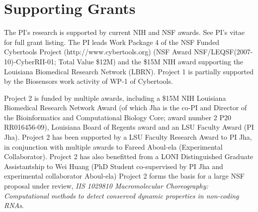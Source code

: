 \documentclass[a4paper,10pt]{article}
\newcommand{\up}{\vspace*{-1em}}
\begin{document}

\up\up
\section*{Supporting Grants}
\up

The PI's research is supported by current NIH and NSF awards.  See PI's vitae for full grant listing.
The PI leads Work Package 4 of the NSF Funded Cybertools Project (http://www.cybertools.org) (NSF Award NSF/LEQSF(2007-10)-CyberRII-01; Total Value \$12M) and the \$15M NIH award supporting the Louisiana Biomedical Research Network (LBRN). Project 1 is partially supported by the Biosensors work activity of WP-1 of Cybertools.

Project 2 is funded by multiple awards, including a \$15M NIH Louisiana Biomedical Research Network Award (of which Jha is the co-PI and Director of the Bioinformatics and Computational Biology Core; award number 2 P20 RR016456-09), Louisiana Board of Regents award and an LSU Faculty Award (PI Jha). Project 2 has been supported by a LSU Faculty Research Award to PI Jha, in conjunction with multiple awards to Fareed Aboul-ela (Experimental Collaborator). Project 2 has also benefitted from a LONI Distinguished Graduate Assistantship to Wei Huang (PhD Student co-supervised by PI Jha and experimental collaborator Aboul-ela) Project 2 forms the basis for a large NSF proposal under review, {\it IIS 1029810 Macromolecular Choreography: Computational methods to detect conserved dynamic properties in non-coding RNAs}.
\end{document}
